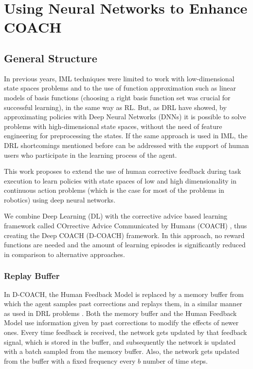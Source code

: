\chapter{Using Neural Networks to Enhance COACH}
\section{General Structure}
In previous years, IML techniques were limited to work with low-dimensional state spaces problems and to the use of function approximation such as linear models of basis functions (choosing a right basis function set was crucial for successful learning), in the same way as RL. But, as DRL have showed, by approximating policies with Deep Neural Networks (DNNs) it is possible to solve problems with high-dimensional state spaces, without the need of feature engineering for preprocessing the states. If the same approach is used in IML, the DRL shortcomings mentioned before can be addressed with the support of human users who participate in the learning process of the agent.

This work proposes to extend the use of human corrective feedback during task execution to learn policies with state spaces of low and high dimensionality in continuous action problems (which is the case for most of the problems in robotics) using deep neural networks.

We combine Deep Learning (DL) with the corrective advice based learning framework called COrrective Advice Communicated by Humans (COACH) \cite{Celemin2018AnInteractive}, thus creating the Deep COACH (D-COACH) framework. In this approach, no reward functions are needed and the amount of learning episodes is significantly reduced in comparison to alternative approaches.
\subsection{Replay Buffer}
In D-COACH, the Human Feedback Model is replaced by a memory buffer from which the agent samples past corrections and replays them, in a similar manner as used in DRL problems \cite{atari}. Both the memory buffer and the Human Feedback Model use information given by past corrections to modify the effects of newer ones. Every time feedback is received, the network gets updated by that feedback signal, which is stored in the buffer, and subsequently the network is updated with a batch sampled from the memory buffer. Also, the network gets updated from the buffer with a fixed frequency every $b$ number of time steps.

